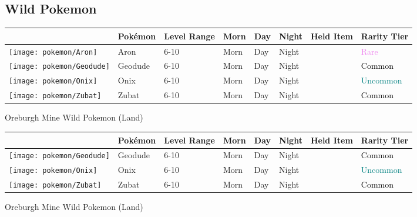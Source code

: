 \subsection{Wild Pokemon}%
\label{subsec:WildPokemon}%
\begin{longtable}{||l l l l l l l l||}%
\hline%
&Pokémon&Level Range&Morn&Day&Night&Held Item&Rarity Tier\\%
\hline%
\endhead%
\hline%
\texttt{[image: pokemon/Aron]}&Aron&6{-}10&Morn&Day&Night&&\textcolor{violet}{%
Rare%
}\\%
\hline%
\texttt{[image: pokemon/Geodude]}&Geodude&6{-}10&Morn&Day&Night&&\textcolor{black}{%
Common%
}\\%
\hline%
\texttt{[image: pokemon/Onix]}&Onix&6{-}10&Morn&Day&Night&&\textcolor{teal}{%
Uncommon%
}\\%
\hline%
\texttt{[image: pokemon/Zubat]}&Zubat&6{-}10&Morn&Day&Night&&\textcolor{black}{%
Common%
}\\%
\hline%
\end{longtable}%
\caption{Oreburgh Mine Wild Pokemon (Land)}%
\begin{longtable}{||l l l l l l l l||}%
\hline%
&Pokémon&Level Range&Morn&Day&Night&Held Item&Rarity Tier\\%
\hline%
\endhead%
\hline%
\texttt{[image: pokemon/Geodude]}&Geodude&6{-}10&Morn&Day&Night&&\textcolor{black}{%
Common%
}\\%
\hline%
\texttt{[image: pokemon/Onix]}&Onix&6{-}10&Morn&Day&Night&&\textcolor{teal}{%
Uncommon%
}\\%
\hline%
\texttt{[image: pokemon/Zubat]}&Zubat&6{-}10&Morn&Day&Night&&\textcolor{black}{%
Common%
}\\%
\hline%
\end{longtable}%
\caption{Oreburgh Mine Wild Pokemon (Land)}